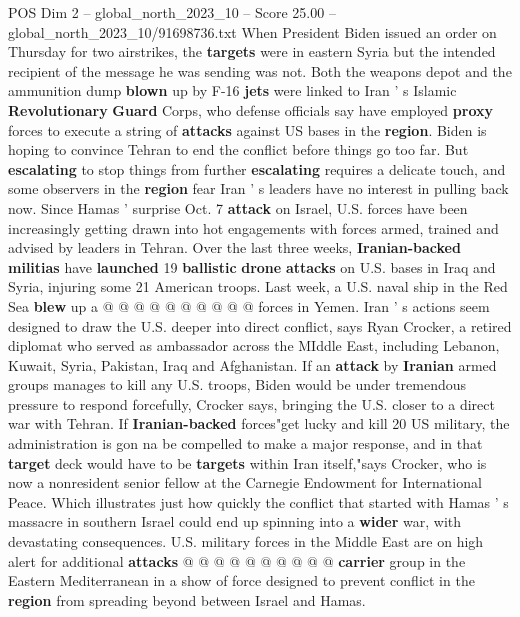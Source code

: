 \begin{textsample}{POS Dim 2 – global\_north\_2023\_10 – Score 25.00 – global\_north\_2023\_10/91698736.txt}  \label{ex:f2_pos_142}
When President Biden issued an order on Thursday for two airstrikes, the \textbf{targets} were in eastern Syria but the intended recipient of the message he was sending was not.
Both the weapons depot and the ammunition dump \textbf{blown} up by F-16 \textbf{jets} were linked to Iran ' s Islamic \textbf{Revolutionary} \textbf{Guard} Corps, who defense officials say have employed \textbf{proxy} forces to execute a string of \textbf{attacks} against US bases in the \textbf{region}.
Biden is hoping to convince Tehran to end the conflict before things go too far.
But \textbf{escalating} to stop things from further \textbf{escalating} requires a delicate touch, and some observers in the \textbf{region} fear Iran ' s leaders have no interest in pulling back now.
Since Hamas ' surprise Oct. 7 \textbf{attack} on Israel, U.S. forces have been increasingly getting drawn into hot engagements with forces armed, trained and advised by leaders in Tehran.
Over the last three weeks, \textbf{Iranian-backed} \textbf{militias} have \textbf{launched} 19 \textbf{ballistic} \textbf{drone} \textbf{attacks} on U.S. bases in Iraq and Syria, injuring some 21 American troops.
Last week, a U.S. naval ship in the Red Sea \textbf{blew} up a @ @ @ @ @ @ @ @ @ @ forces in Yemen.
Iran ' s actions seem designed to draw the U.S. deeper into direct conflict, says Ryan Crocker, a retired diplomat who served as ambassador across the MIddle East, including Lebanon, Kuwait, Syria, Pakistan, Iraq and Afghanistan.
If an \textbf{attack} by \textbf{Iranian} armed groups manages to kill any U.S. troops, Biden would be under tremendous pressure to respond forcefully, Crocker says, bringing the U.S. closer to a direct war with Tehran.
If \textbf{Iranian-backed} forces"get lucky and kill 20 US military, the administration is gon na be compelled to make a major response, and in that \textbf{target} deck would have to be \textbf{targets} within Iran itself,"says Crocker, who is now a nonresident senior fellow at the Carnegie Endowment for International Peace.
Which illustrates just how quickly the conflict that started with Hamas ' s massacre in southern Israel could end up spinning into a \textbf{wider} war, with devastating consequences.
U.S. military forces in the Middle East are on high alert for additional \textbf{attacks} @ @ @ @ @ @ @ @ @ @ \textbf{carrier} group in the Eastern Mediterranean in a show of force designed to prevent conflict in the \textbf{region} from spreading beyond between Israel and Hamas.

\end{textsample}
